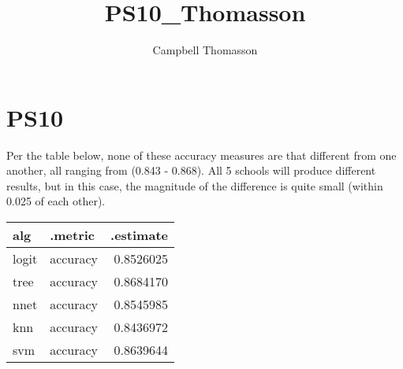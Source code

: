 \documentclass{article}
\title{PS10_Thomasson}
\author{Campbell Thomasson}
\begin{document}
\maketitle

\section{PS10}

Per the table below, none of these accuracy measures are that different from one another, all ranging from (0.843 - 0.868). All 5 schools will produce different results, but in this case, the magnitude of the difference is quite small (within 0.025 of each other).

\begin{tabular}{llr}
\toprule
alg & .metric & .estimate\\
\midrule
logit & accuracy & 0.8526025\\
tree & accuracy & 0.8684170\\
nnet & accuracy & 0.8545985\\
knn & accuracy & 0.8436972\\
svm & accuracy & 0.8639644\\
\bottomrule
\end{tabular}
\end{document}

